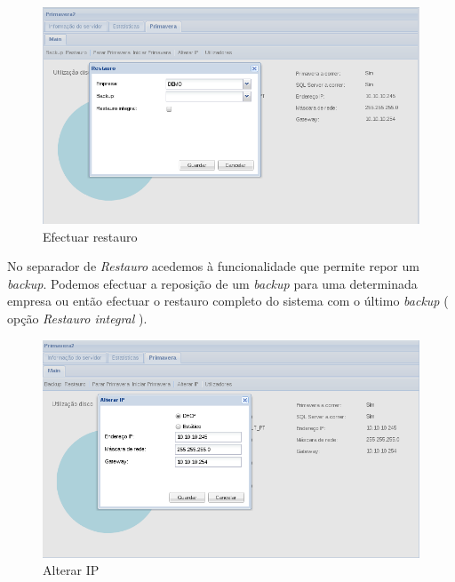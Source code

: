 \begin{figure}[H]
    \begin{center}
    \includegraphics[scale=0.38]{screenshots/primavera/primaverainterface_05.png}
    \caption{Efectuar restauro}
    \label{fig:primavera_restore}
    \end{center}
\end{figure}

No separador de \textit{Restauro} acedemos à funcionalidade que permite repor um \textit{backup}. 
Podemos efectuar a reposição de um \textit{backup} para uma determinada empresa ou então efectuar o restauro completo do sistema com o último \textit{backup} ( opção \textit{Restauro integral} ).

\begin{figure}[H]
    \begin{center}
    \includegraphics[scale=0.38]{screenshots/primavera/primaverainterface_06.png}
    \caption{Alterar IP}
    \label{fig:primavera_change_ip}
    \end{center}
\end{figure}

